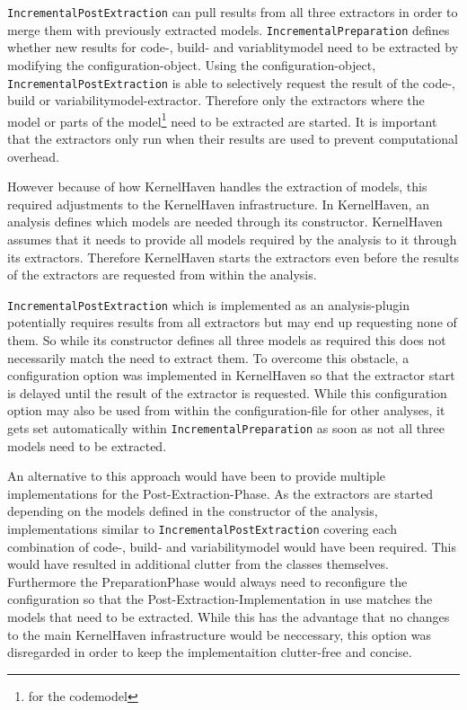 \documentclass[a4paper]{article}
\begin{document}
\texttt{IncrementalPostExtraction} can pull results from all three extractors in order to merge them with previously extracted models. \texttt{IncrementalPreparation} defines whether new results for code-, build- and variablitymodel need to be extracted by modifying the configuration-object. Using the configuration-object, \texttt{IncrementalPostExtraction} is able to selectively request the result of the code-, build or variabilitymodel-extractor. Therefore only the extractors where the model or parts of the model\footnote{for the codemodel} need to be extracted are started. It is important that the extractors only run when their results are used to prevent computational overhead.

However because of how KernelHaven handles the extraction of models, this required adjustments to the KernelHaven infrastructure. In KernelHaven, an analysis defines which models are needed through its constructor. KernelHaven assumes that it needs to provide all models required by the analysis to it through its extractors. Therefore KernelHaven starts the extractors even before the results of the extractors are requested from within the analysis. 

\texttt{IncrementalPostExtraction} which is implemented as an analysis-plugin potentially requires results from all extractors but may end up requesting none of them. So while its constructor defines all three models as required this does not necessarily match the need to extract them. To overcome this obstacle, a configuration option was implemented in KernelHaven so that the extractor start is delayed until the result of the extractor is requested. While this configuration option may also be used from within the configuration-file for other analyses, it gets set automatically within \texttt{IncrementalPreparation} as soon as not all three models need to be extracted.

An alternative to this approach would have been to provide multiple implementations for the Post-Extraction-Phase. As the extractors are started depending on the models defined in the constructor of the analysis, implementations similar to \texttt{IncrementalPostExtraction} covering each combination of code-, build- and variabilitymodel would have been required. This would have resulted in additional clutter from the classes themselves. Furthermore the PreparationPhase would always need to reconfigure the configuration so that the Post-Extraction-Implementation in use matches the models that need to be extracted. While this has the advantage that no changes to the main KernelHaven infrastructure would be neccessary, this option was disregarded in order to keep the implementaition clutter-free and concise.
\end{document}
